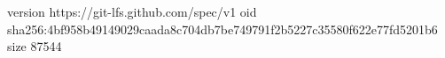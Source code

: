 version https://git-lfs.github.com/spec/v1
oid sha256:4bf958b49149029caada8c704db7be749791f2b5227c35580f622e77fd5201b6
size 87544
